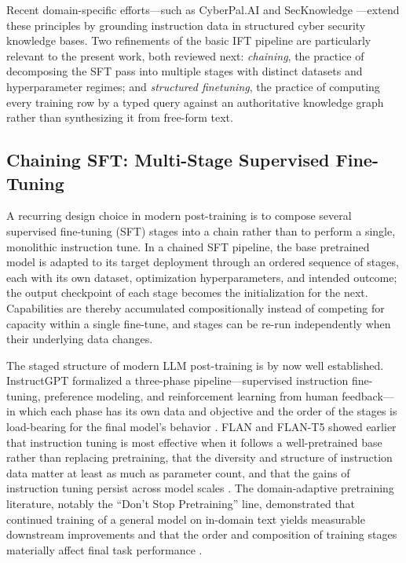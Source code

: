 \documentclass[unnumsec,webpdf,contemporary,large]{oup-authoring-template}
\theoremstyle{thmstyleone}
\theoremstyle{thmstyletwo}
\theoremstyle{thmstylethree}
\begin{document}
Recent domain-specific efforts---such as CyberPal.AI and SecKnowledge \cite{levi2024cyberpal,levi2025toward}---extend these principles by grounding instruction data in structured cyber security knowledge bases. Two refinements of the basic IFT pipeline are particularly relevant to the present work, both reviewed next: \emph{chaining}, the practice of decomposing the SFT pass into multiple stages with distinct datasets and hyperparameter regimes; and \emph{structured finetuning}, the practice of computing every training row by a typed query against an authoritative knowledge graph rather than synthesizing it from free-form text.

\subsection{Chaining SFT: Multi-Stage Supervised Fine-Tuning}
\label{sec:intro-chained-sft}

A recurring design choice in modern post-training is to compose several supervised fine-tuning (SFT) stages into a chain rather than to perform a single, monolithic instruction tune. In a chained SFT pipeline, the base pretrained model is adapted to its target deployment through an ordered sequence of stages, each with its own dataset, optimization hyperparameters, and intended outcome; the output checkpoint of each stage becomes the initialization for the next. Capabilities are thereby accumulated compositionally instead of competing for capacity within a single fine-tune, and stages can be re-run independently when their underlying data changes.

The staged structure of modern LLM post-training is by now well established. InstructGPT formalized a three-phase pipeline---supervised instruction fine-tuning, preference modeling, and reinforcement learning from human feedback---in which each phase has its own data and objective and the order of the stages is load-bearing for the final model's behavior \cite{ouyang2022instructgpt}. FLAN and FLAN-T5 showed earlier that instruction tuning is most effective when it follows a well-pretrained base rather than replacing pretraining, that the diversity and structure of instruction data matter at least as much as parameter count, and that the gains of instruction tuning persist across model scales \cite{wei2022flan,chung2022flant5}. The domain-adaptive pretraining literature, notably the ``Don't Stop Pretraining'' line, demonstrated that continued training of a general model on in-domain text yields measurable downstream improvements and that the order and composition of training stages materially affect final task performance \cite{gururangan2020dontstop}.
\end{document}
